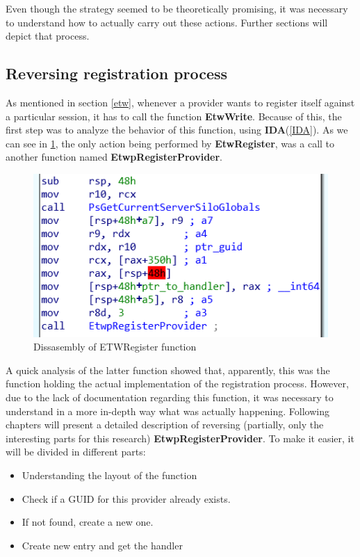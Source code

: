 Even though the strategy seemed to be theoretically promising, it was necessary to understand how to actually carry out these actions. Further sections will depict that process.













\subsection{Reversing registration process}
As mentioned in section \ref{etw}, whenever a provider wants to register itself against a particular session, it has to call the function {\bfseries EtwWrite}.
Because of this, the first step was to analyze the behavior of this function, using {\bfseries IDA}(\ref{IDA}). As we can see in \ref{fig:etwRegister_code}, the only action being performed by {\bfseries EtwRegister}, was a call to another function named {\bfseries EtwpRegisterProvider}. 

\begin{centering}
\begin{figure}[H]
  \includegraphics[width=12cm]{images/etwRegister_code.png}
  \caption[]{Dissasembly of ETWRegister function}
  \label{fig:etwRegister_code}
\end{figure}
\end{centering}

A quick analysis of the latter function showed that, apparently, this was the function holding the actual implementation of the registration process. However, due to the lack of documentation regarding this function, it was necessary to understand in a more in-depth way what was actually happening. Following chapters will present a detailed description of reversing (partially, only the interesting parts for this research) {\bfseries EtwpRegisterProvider}. 
To make it easier, it will be divided in different parts:
\begin{itemize}
  \item Understanding the layout of the function
  \item Check if a GUID for this provider already exists.
  \item If not found, create a new one.
  \item Create new entry and get the handler 
\end{itemize}





